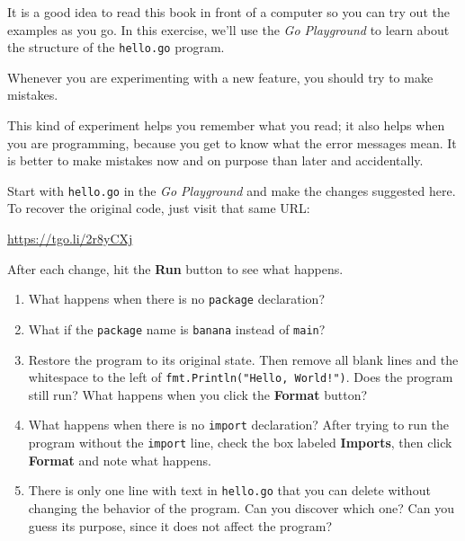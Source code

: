 \begin{exercise}

It is a good idea to read this book in front of a computer so you can try out
the examples as you go. In this exercise, we'll use the {\it Go Playground}
to learn about the structure of the {\tt hello.go} program.

Whenever you are experimenting with a new feature, you should try to make
mistakes. 

This kind of experiment helps you remember what you read; it also
helps when you are programming, because you get to know what the error
messages mean. It is better to make mistakes now and on purpose than
later and accidentally.

Start with {\tt hello.go} in the {\it Go Playground} and make the changes
suggested here. To recover the original code, just visit that same URL:

\url{https://tgo.li/2r8yCXj}

After each change, hit the {\bf Run} button to see what happens.

\begin{enumerate}

\item What happens when there is no {\tt package} declaration?

\item What if the {\tt package} name is {\tt banana} instead of {\tt main}? 

\item Restore the program to its original state. Then remove all blank lines
and the whitespace to the left of {\tt fmt.Println("Hello, World!")}. Does the
program still run? What happens when you click the {\bf Format} button?

\item What happens when there is no {\tt import} declaration? After trying 
to run the program without the {\tt import} line, check the box labeled
{\bf Imports}, then click {\bf Format} and note what happens.

\item There is only one line with text in {\tt hello.go} that you can delete
without changing the behavior of the program. Can you discover which one?
Can you guess its purpose, since it does not affect the program?


\end{enumerate}

\end{exercise}


